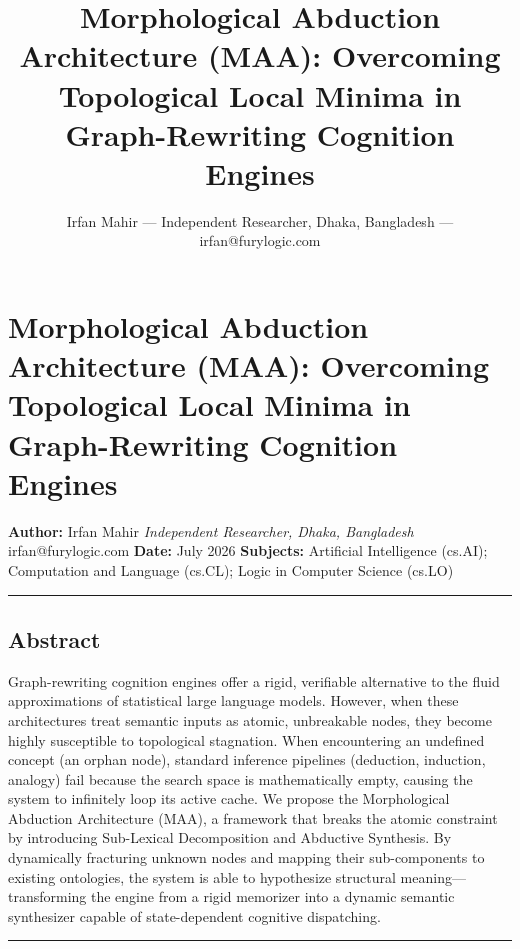 \documentclass[
  11pt,
  a4paper,
]{article}
\title{Morphological Abduction Architecture (MAA): Overcoming
Topological Local Minima in Graph-Rewriting Cognition Engines}
\author{Irfan Mahir --- Independent Researcher, Dhaka, Bangladesh ---
irfan@furylogic.com}
\date{}
\begin{document}
\maketitle

{
\hypersetup{linkcolor=}
\setcounter{tocdepth}{3}
\tableofcontents
}
\section{Morphological Abduction Architecture (MAA): Overcoming
Topological Local Minima in Graph-Rewriting Cognition
Engines}\label{morphological-abduction-architecture-maa-overcoming-topological-local-minima-in-graph-rewriting-cognition-engines}

\textbf{Author:} Irfan Mahir \emph{Independent Researcher, Dhaka,
Bangladesh} irfan@furylogic.com \textbf{Date:} July 2026
\textbf{Subjects:} Artificial Intelligence (cs.AI); Computation and
Language (cs.CL); Logic in Computer Science (cs.LO)

\begin{center}\rule{0.5\linewidth}{0.5pt}\end{center}

\subsection{Abstract}\label{abstract}

Graph-rewriting cognition engines offer a rigid, verifiable alternative
to the fluid approximations of statistical large language models.
However, when these architectures treat semantic inputs as atomic,
unbreakable nodes, they become highly susceptible to topological
stagnation. When encountering an undefined concept (an orphan node),
standard inference pipelines (deduction, induction, analogy) fail
because the search space is mathematically empty, causing the system to
infinitely loop its active cache. We propose the Morphological Abduction
Architecture (MAA), a framework that breaks the atomic constraint by
introducing Sub-Lexical Decomposition and Abductive Synthesis. By
dynamically fracturing unknown nodes and mapping their sub-components to
existing ontologies, the system is able to hypothesize structural
meaning---transforming the engine from a rigid memorizer into a dynamic
semantic synthesizer capable of state-dependent cognitive dispatching.

\begin{center}\rule{0.5\linewidth}{0.5pt}\end{center}
\end{document}
